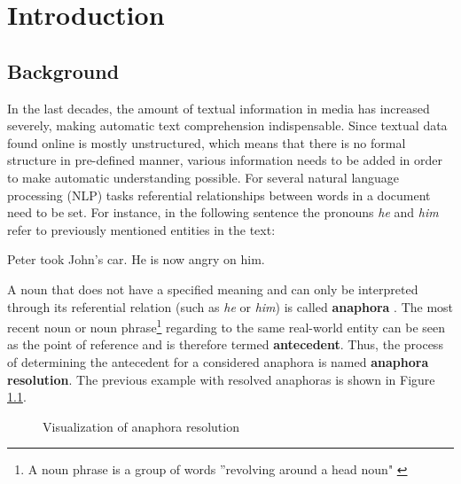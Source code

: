 \chapter{Introduction}
\label{sec:Introduction}

\section{Background}

In the last decades, the amount of textual information in media has increased severely, making automatic text comprehension indispensable. Since textual data found online is mostly unstructured, which means that there is no formal structure in pre-defined manner, various information needs to be added in order to make automatic understanding possible. For several natural language processing (NLP) tasks referential relationships between words in a document need to be set. For instance, in the following sentence the pronouns \textit{he} and \textit{him} refer to previously mentioned entities in the text:

\begin{center}
Peter took John's car. He is now angry on him.
\end{center}

A noun that does not have a specified meaning and can only be interpreted through its referential relation (such as \textit{he} or \textit{him}) is called \textbf{anaphora} \citep{recasens2007anaphora}. The most recent noun or noun phrase\footnote{A noun phrase is a group of words ''revolving around a head noun" \citep{jurafsky2014speech}} regarding to the same real-world entity can be seen as the point of reference and is therefore termed \textbf{antecedent}. Thus, the process of determining the antecedent for a considered anaphora is named \textbf{anaphora resolution}. The previous example with resolved anaphoras is shown in Figure \ref{figure:visofanaphora}.

\begin{figure}[h]
	\centering\sffamily
	\caption{Visualization of anaphora resolution}
	\label{figure:visofanaphora}
\end{figure}

